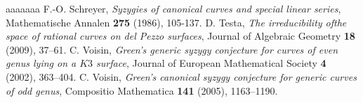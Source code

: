 \documentclass[11pt]{amsart}
\theoremstyle{definition}
\begin{document}
\begin{thebibliography}{aaaaaaa}
 F.-O. Schreyer, {\em{Syzygies of canonical curves and special linear series}}, Mathematische Annalen \textbf{275} (1986), 105-137.
 D. Testa, {\em{The irreducibility ofthe space of rational curves on del Pezzo surfaces}}, Journal of Algebraic Geometry \textbf{18} (2009), 37--61.
 C. Voisin, {\em{Green's generic syzygy conjecture
for curves of even genus lying on a $K3$ surface}}, Journal of
European Mathematical Society \textbf{4} (2002), 363--404.
 C. Voisin, {\em{Green's canonical syzygy conjecture for generic curves of odd genus}},
Compositio Mathematica \textbf{141} (2005), 1163--1190.

\end{thebibliography}
\end{document}
